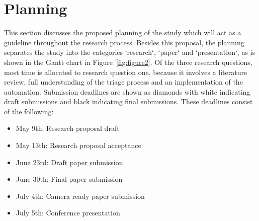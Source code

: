 \section{Planning}
\label{sec:planning}

This section discusses the proposed planning of the study which will act as a guideline throughout the research process.
Besides this proposal, the planning separates the study into the categories `research`, `paper` and `presentation`,
as is shown in the Gantt chart in Figure\ \ref{fig:figure2}.
Of the three research questions, most time is allocated to research question one, because it involves a literature
review, full understanding of the triage process and an implementation of the automation.
Submission deadlines are shown as diamonds with white indicating draft submissions and black indicating final
submissions.
These deadlines consist of the following:

\begin{itemize}
    \item May 9th: Research proposal draft
    \item May 13th: Research proposal acceptance
    \item June 23rd: Draft paper submission
    \item June 30th: Final paper submission
    \item July 4th: Camera ready paper submission
    \item July 5th: Conference presentation
\end{itemize}



\newcount\off\off\startdow\multiply{}\advance{}
\ifnum{}
\else
    \if{}
    \else
    \fi
\fi

